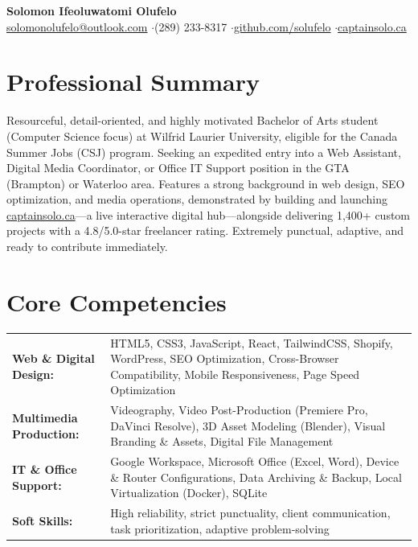 \documentclass[a4paper,10pt]{article}
\begin{document}
\begin{center}
    {\LARGE \textbf{Solomon Ifeoluwatomi Olufelo}} \\[2pt]
    \href{mailto:solomonolufelo@outlook.com}{solomonolufelo@outlook.com} \enspace$\cdot$\enspace (289) 233-8317 \enspace$\cdot$\enspace \href{https://github.com/solufelo}{github.com/solufelo} \enspace$\cdot$\enspace \href{https://captainsolo.ca}{captainsolo.ca}
\end{center}

\section*{Professional Summary}
Resourceful, detail-oriented, and highly motivated Bachelor of Arts student (Computer Science focus) at Wilfrid Laurier University, eligible for the Canada Summer Jobs (CSJ) program. Seeking an expedited entry into a Web Assistant, Digital Media Coordinator, or Office IT Support position in the GTA (Brampton) or Waterloo area. Features a strong background in web design, SEO optimization, and media operations, demonstrated by building and launching \href{https://captainsolo.ca}{captainsolo.ca}—a live interactive digital hub—alongside delivering 1,400+ custom projects with a 4.8/5.0-star freelancer rating. Extremely punctual, adaptive, and ready to contribute immediately.

\section*{Core Competencies}
\begin{tabularx}{\textwidth}{@{}lX@{}}
\textbf{Web \& Digital Design:} & HTML5, CSS3, JavaScript, React, TailwindCSS, Shopify, WordPress, SEO Optimization, Cross-Browser Compatibility, Mobile Responsiveness, Page Speed Optimization \\
\textbf{Multimedia Production:} & Videography, Video Post-Production (Premiere Pro, DaVinci Resolve), 3D Asset Modeling (Blender), Visual Branding \& Assets, Digital File Management \\
\textbf{IT \& Office Support:} & Google Workspace, Microsoft Office (Excel, Word), Device \& Router Configurations, Data Archiving \& Backup, Local Virtualization (Docker), SQLite \\
\textbf{Soft Skills:} & High reliability, strict punctuality, client communication, task prioritization, adaptive problem-solving \\
\end{tabularx}
\end{document}
